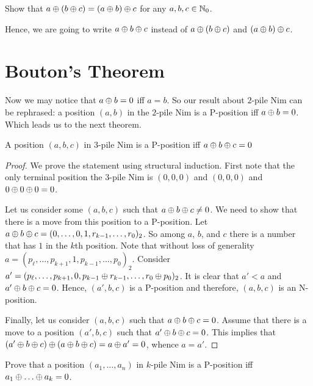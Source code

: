 \begin{exercise}
  Show that $a \oplus (b \oplus c) = (a \oplus b) \oplus c$
  for any $a, b, c \in {\mathbb{N}}_0$.
\end{exercise}
Hence, we are going to write $a \oplus b \oplus c$ instead of
$a \oplus (b \oplus c)$ and $(a \oplus b) \oplus c$.

\section{Bouton's Theorem}

Now we may notice that $a \oplus b = 0$ iff $a = b$. So
our result about $2$-pile Nim can be rephrased:
a position $(a, b)$ in the $2$-pile Nim is a P-position iff
$a \oplus b = 0$. Which leads us to the next theorem.
\begin{theorem}[Bouton]
\label{theorem:bouton}
  A position $(a, b, c)$ in $3$-pile Nim is a P-position iff
  $a \oplus b \oplus c = 0$
\end{theorem}
\begin{proof}
  We prove the statement using structural induction.
  First note that the only terminal position the $3$-pile Nim is $(0, 0, 0)$
  and $(0, 0, 0)$ and $0 \oplus 0 \oplus 0 = 0$.

  Let us consider
  some $(a, b, c)$ such that $a \oplus b \oplus c \neq 0$.
  We need to show that there is a move from this position to a P-position.
  Let $a \oplus b \oplus c =
      (0, \dots, 0, 1, r_{k - 1}, \dots, r_0)_2$. So among $a$, $b$, and $c$
  there is a number that has $1$ in the $k$th position.
  Note that without loss of generality
  $a = (p_\ell, \dots, p_{k + 1}, 1, p_{k - 1}, \dots, p_0)_2$.
  Consider $a' = (p_\ell, \dots, p_{k + 1}, 0,
    p_{k - 1} \oplus r_{k - 1}, \dots, r_0 \oplus p_0)_2$. It is clear that
  $a' < a$ and $a' \oplus b \oplus c = 0$.
  Hence, $(a', b, c)$ is a P-position and therefore, $(a, b, c)$ is an
  N-position.

  Finally, let us consider $(a, b, c)$ such that
  $a \oplus b \oplus c = 0$. Assume that there is a move to a
  position $(a', b, c)$ such that $a' \oplus b \oplus c = 0$.
  This implies that
  $(a' \oplus b \oplus c) \oplus
      (a \oplus b \oplus c) =  a \oplus a' = 0$, whence $a = a'$.
\end{proof}

\begin{exercise}
  Prove that a position $(a_1, \dots, a_n)$ in $k$-pile Nim is a P-position
  iff $a_1 \bitwisexor \dots \bitwisexor a_k = 0$.
\end{exercise}


